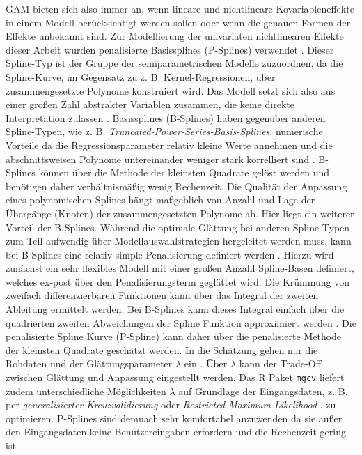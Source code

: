 \documentclass{Vorlage}
\begin{document}
GAM bieten sich also immer an, wenn lineare und nichtlineare Kovariableneffekte in einem Modell berücksichtigt werden sollen oder wenn die genauen Formen der Effekte unbekannt sind. Zur Modellierung der univariaten nichtlinearen Effekte dieser Arbeit wurden penalisierte Basissplines (P-Splines) verwendet \cite{eilers1996}. Dieser Spline-Typ ist der Gruppe der semiparametrischen Modelle zuzuordnen, da die Spline-Kurve, im Gegensatz zu z. B. Kernel-Regressionen, über zusammengesetzte Polynome konstruiert wird. Das Modell setzt sich also aus einer großen Zahl abstrakter Variablen zusammen, die keine direkte Interpretation zulassen \cite[p. 1]{eilers1996}. Basissplines (B-Splines) haben gegenüber anderen Spline-Typen, wie z. B. \textit{Truncated-Power-Series-Basis-Splines}, numerische Vorteile da die Regressionsparameter relativ kleine Werte annehmen und die abschnittsweisen Polynome untereinander weniger stark korrelliert sind \cite[p. 426]{fahrmeir2013regression}. B-Splines können über die Methode der kleinsten Quadrate gelöst werden \cite[p. 430]{fahrmeir2013regression} und benötigen daher verhältnismäßig wenig Rechenzeit. Die Qualität der Anpassung eines polynomischen Splines hängt maßgeblich von Anzahl und Lage der Übergänge (Knoten) der zusammengesetzten Polynome ab. Hier liegt ein weiterer Vorteil der B-Splines. Während die optimale Glättung bei anderen Spline-Typen zum Teil aufwendig über Modellauswahlstrategien hergeleitet werden muss, kann bei B-Splines eine relativ simple Penalisierung definiert werden \cite[p. 89 f.]{eilers1996}. Hierzu wird zunächst ein sehr flexibles Modell mit einer großen Anzahl Spline-Basen definiert, welches ex-post über den Penalisierungsterm geglättet wird. Die Krümmung von zweifach differenzierbaren Funktionen kann über das Integral der zweiten Ableitung ermittelt werden. Bei B-Splines kann dieses Integral einfach über die quadrierten zweiten Abweichungen der Spline Funktion approximiert werden \cite[p. 433]{fahrmeir2013regression}. Die penalisierte Spline Kurve (P-Spline) kann daher über die penalisierte Methode der kleinsten Quadrate geschätzt werden. In die Schätzung gehen nur die Rohdaten und der Glättungsparameter $\lambda$ ein \cite[p. 93]{eilers1996}. Über $\lambda$ kann der Trade-Off zwischen Glättung und Anpassung eingestellt werden. Das R Paket \texttt{mgcv} \cite{Wood2011} liefert zudem unterschiedliche Möglichkeiten $\lambda$ auf Grundlage der Eingangsdaten, z. B. per \textit{generalisierter Kreuzvalidierung} \cite[p. 480]{fahrmeir2013regression} oder \textit{Restricted Maximum Likelihood} \cite[p. 32 f.]{wood2016}, zu optimieren. P-Splines sind demnach sehr komfortabel anzuwenden da sie außer den Eingangsdaten keine Benutzereingaben erfordern und die Rechenzeit gering ist.\\
\end{document}
